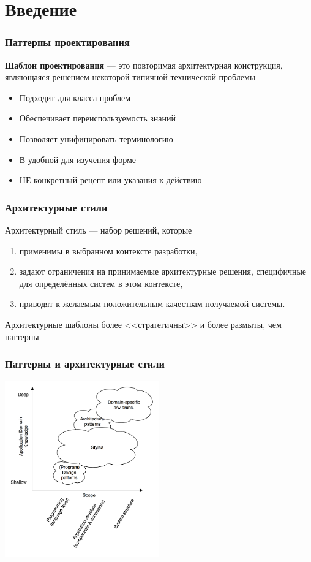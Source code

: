 \documentclass{../../slides-style}
\begin{document}
    \begin{frame}[plain]
        \titlepage
    \end{frame}

    \section{Введение}

    \begin{frame}
        \frametitle{Паттерны проектирования}
        \textbf{Шаблон проектирования} --- это повторимая архитектурная конструкция, являющаяся решением некоторой типичной технической проблемы
        \begin{itemize}
            \item Подходит для класса проблем
            \item Обеспечивает переиспользуемость знаний
            \item Позволяет унифицировать терминологию
            \item В удобной для изучения форме
            \item НЕ конкретный рецепт или указания к действию
        \end{itemize}
    \end{frame}
 
    \begin{frame}
        \frametitle{Архитектурные стили}
        Архитектурный стиль --- набор решений, которые
        \begin{enumerate}
            \item применимы в выбранном контексте разработки,
            \item задают ограничения на принимаемые архитектурные решения, специфичные для определённых систем в этом контексте,
            \item приводят к желаемым положительным качествам получаемой системы.
        \end{enumerate}
        Архитектурные шаблоны более <<стратегичны>> и более размыты, чем паттерны
    \end{frame}

    \begin{frame}
        \frametitle{Паттерны и архитектурные стили}
        \begin{center}
            \includegraphics[width=0.5\textwidth]{architecturalStyles.png}
        \end{center}
    \end{frame}
\end{document}
